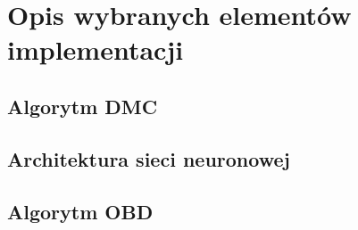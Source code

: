 \newpage %
\section{Opis wybranych elementów implementacji}

\subsection{Algorytm DMC}
\subsection{Architektura sieci neuronowej}
\subsection{Algorytm OBD}
